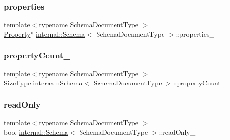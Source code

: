 \mbox{\label{classinternal_1_1Schema_a6a74a3682659e92f73c4e70a91e4ec1c}} 
\subsubsection{\texorpdfstring{properties\+\_\+}{properties\_}}
{\footnotesize\ttfamily template$<$typename Schema\+Document\+Type $>$ \\
\hyperlink{structinternal_1_1Schema_1_1Property}{Property}$\ast$ \hyperlink{classinternal_1_1Schema}{internal\+::\+Schema}$<$ Schema\+Document\+Type $>$\+::properties\+\_\+\hspace{0.3cm}{\ttfamily [private]}}

\mbox{\label{classinternal_1_1Schema_adf582d05aa0e8692b610f129134dbae1}} 
\subsubsection{\texorpdfstring{property\+Count\+\_\+}{propertyCount\_}}
{\footnotesize\ttfamily template$<$typename Schema\+Document\+Type $>$ \\
\hyperlink{rapidjson_8h_a5ed6e6e67250fadbd041127e6386dcb5}{Size\+Type} \hyperlink{classinternal_1_1Schema}{internal\+::\+Schema}$<$ Schema\+Document\+Type $>$\+::property\+Count\+\_\+\hspace{0.3cm}{\ttfamily [private]}}

\mbox{\label{classinternal_1_1Schema_a342717a1ca95f8aebf72ca067975025c}} 
\subsubsection{\texorpdfstring{read\+Only\+\_\+}{readOnly\_}}
{\footnotesize\ttfamily template$<$typename Schema\+Document\+Type $>$ \\
bool \hyperlink{classinternal_1_1Schema}{internal\+::\+Schema}$<$ Schema\+Document\+Type $>$\+::read\+Only\+\_\+\hspace{0.3cm}{\ttfamily [private]}}

